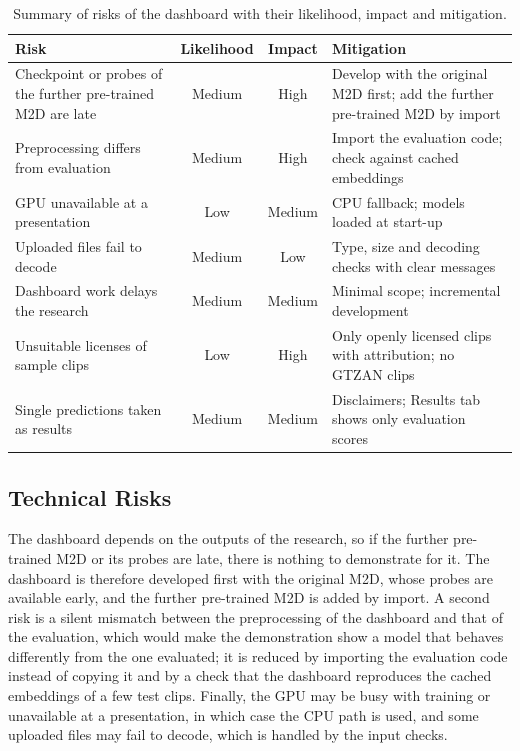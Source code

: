 \documentclass{FastFyp}
\begin{document}
\begin{table}[htbp]
\centering
\caption[Summary of risks of the dashboard]{Summary of risks of the dashboard with their likelihood, impact and mitigation.}
\label{tab:srs-risks}
\small\singlespacing
\begin{tabularx}{\linewidth}{>{\raggedright\arraybackslash}p{4.0cm}ccY}
\toprule
\textbf{Risk} & \textbf{Likelihood} & \textbf{Impact} & \textbf{Mitigation}\\
\midrule
Checkpoint or probes of the further pre-trained M2D are late & Medium & High & Develop with the original M2D first; add the further pre-trained M2D by import\\
Preprocessing differs from evaluation & Medium & High & Import the evaluation code; check against cached embeddings\\
GPU unavailable at a presentation & Low & Medium & CPU fallback; models loaded at start-up\\
Uploaded files fail to decode & Medium & Low & Type, size and decoding checks with clear messages\\
Dashboard work delays the research & Medium & Medium & Minimal scope; incremental development\\
Unsuitable licenses of sample clips & Low & High & Only openly licensed clips with attribution; no GTZAN clips\\
Single predictions taken as results & Medium & Medium & Disclaimers; Results tab shows only evaluation scores\\
\bottomrule
\end{tabularx}
\end{table}

\subsection{Technical Risks}
The dashboard depends on the outputs of the research, so if the further pre-trained M2D or its probes are late, there is nothing to demonstrate for it. The dashboard is therefore developed first with the original M2D, whose probes are available early, and the further pre-trained M2D is added by import. A second risk is a silent mismatch between the preprocessing of the dashboard and that of the evaluation, which would make the demonstration show a model that behaves differently from the one evaluated; it is reduced by importing the evaluation code instead of copying it and by a check that the dashboard reproduces the cached embeddings of a few test clips. Finally, the GPU may be busy with training or unavailable at a presentation, in which case the CPU path is used, and some uploaded files may fail to decode, which is handled by the input checks.
\end{document}
